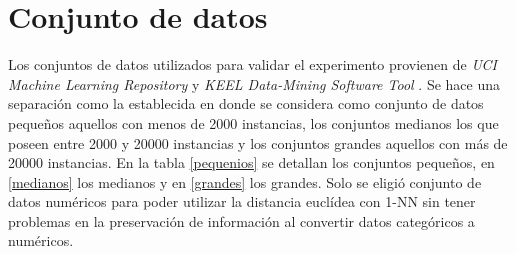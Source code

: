 \section{Conjunto de datos}

Los conjuntos de datos utilizados para validar el experimento provienen de \emph{UCI Machine Learning Repository} \cite{Dua:2017} y \emph{KEEL Data-Mining Software Tool} \cite{alcala2011keel}. Se hace una separación como la establecida en \cite{de2004reduccion} donde se considera como conjunto de datos pequeños aquellos con menos de 2000 instancias, los conjuntos medianos los que poseen entre 2000 y 20000 instancias y los conjuntos grandes aquellos con más de 20000 instancias. En la tabla \ref{pequenios} se detallan los conjuntos pequeños, en \ref{medianos} los medianos y en \ref{grandes} los grandes. Solo se eligió conjunto de datos numéricos para poder utilizar la distancia euclídea con 1-NN sin tener problemas en la preservación de información al convertir datos categóricos a numéricos.

